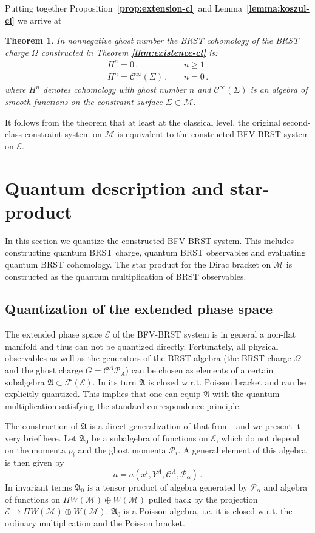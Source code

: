 \documentclass[a4paper,11pt]{amsart}
\newtheorem{thm}{Theorem}
\numberwithin{thm}{section} %
\numberwithin{equation}{section} %
\numberwithin{figure}{section} %
\newcommand{\bref}[1]{{\bf \ref{#1}}}
\renewcommand{\:}{{\rm\, :\,}}
\newcommand{\func}[1]{{{\mathcal C}^\infty}{(#1)}}             %
\def\cP{{\mathcal P}}
\def\cc{{\mathcal C}}
\def\cF{{\mathcal F}}
\def\manM{{\mathcal M}}
\def\aA{{ \mathfrak A}}
\def\E{{ \mathcal E}}
\begin{document}
Putting together Proposition~\bref{prop:extension-cl} and
Lemma~\bref{lemma:koszul-cl} we arrive at
\begin{thm}\label{thm:H-cl}
In nonnegative ghost number the BRST cohomology of the BRST charge
$\Omega$ constructed in Theorem \bref{thm:existence-cl} is:
\begin{equation}
\begin{split}
H^n=0\,,&\quad n\geq 1\\
H^n=\func{\Sigma}\,, & \quad n=0\,.
\end{split}
\end{equation}
where $H^n$ denotes cohomology with ghost number $n$ and
$\func\Sigma$ is an algebra of smooth functions on the
constraint surface $\Sigma \subset \manM$.
\end{thm}
It follows from the theorem that at least at the classical level,
the original second-class constraint system on $\manM$ is equivalent
to the constructed BFV-BRST system on $\E$.

\section{Quantum description and star-product}\label{sec:q}
In this section we quantize the constructed BFV-BRST system.
This includes constructing quantum BRST charge, quantum BRST
observables and evaluating quantum BRST cohomology. The star product
for the Dirac bracket on $\manM$ is constructed as the quantum
multiplication of BRST observables.

\subsection{Quantization of the extended phase space}\label{subsec:quantization}
The extended phase space $\E$ of the BFV-BRST system is in general
a non-flat manifold and thus can not be quantized directly.
Fortunately, all physical observables
as well as the generators of the BRST algebra
(the BRST charge $\Omega$ and the ghost charge $G=\cc^A\cP_A$)
can be chosen as elements of a certain subalgebra
$\aA\subset\cF(\E)$.  In its turn $\aA$ is closed
w.r.t. Poisson bracket and can be explicitly quantized.  This implies
that one can equip $\aA$ with the quantum multiplication satisfying
the standard correspondence principle.


The construction of $\aA$ is a direct generalization
of that from~\cite{[GL]} and we present it very brief here.
Let $\aA_0$ be a subalgebra of functions on $\E$,
which do not depend on the momenta $p_i$ and the ghost momenta
$\cP_i$.  A general element of this algebra is then given
by
\begin{equation}
  a=a(x^i,Y^A,\cc^A,\cP_\alpha)\,.
\end{equation}
In invariant terms $\aA_0$ is a tensor product
of algebra generated by $\cP_\alpha$ and algebra of functions
on $\Pi W(\manM)\oplus W(\manM)$ pulled back
by the projection $\E \to \Pi W(\manM)\oplus W(\manM)$. $\aA_0$ is a Poisson algebra,
i.e. it is closed w.r.t. the ordinary multiplication and the Poisson
bracket.
\end{document}
